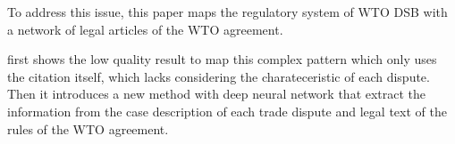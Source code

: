 To address this issue, 
this paper maps 
the regulatory system of WTO DSB 
with a network of legal articles 
of the WTO agreement. 




first shows the low quality result to map this complex pattern which only uses the citation itself, which lacks considering the charateceristic of each dispute.
Then it introduces a new method with deep neural network that extract the information from the case description of each trade dispute and legal text of the rules of the WTO agreement.

